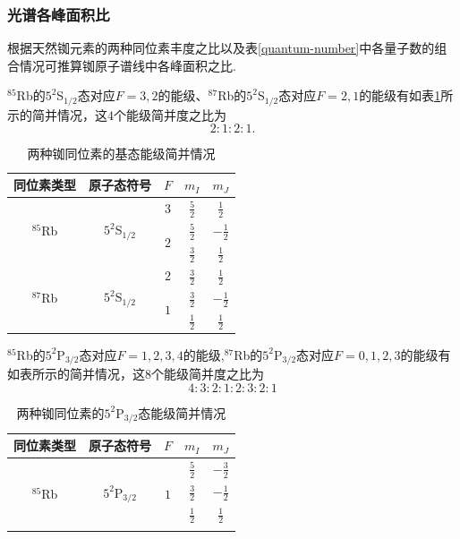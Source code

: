\documentclass[a4paper, 10pt]{article}
\begin{document}
\begin{multicols*}{2}
\subsubsection{光谱各峰面积比}
根据天然铷元素的两种同位素丰度之比以及表\ref{quantum-number}中各量子数的组合情况可推算铷原子谱线中各峰面积之比.

$^{85}$Rb的$5^2$S$_{1/2}$态对应$F=3,2$的能级、$^{87}$Rb的$5^2$S$_{1/2}$态对应$F=2,1$的能级有如表\ref{ground-state-degenerate}所示的简并情况，这$4$个能级简并度之比为
\[
    2:1:2:1.
\]
\begin{table}[H]
    \centering
    \scriptsize
    \caption{两种铷同位素的基态能级简并情况}
    \label{ground-state-degenerate}
    \begin{tabular}{|c|c|c|c|c|}
    \hline
    同位素类型 & 原子态符号 & $F$ & $m_I$ & $m_J$ \\ \hline
    \multirow{3}{*}{$^{85}$Rb} & \multirow{3}{*}{$5^2$S$_{1/2}$} & $3$ & $\frac{5}{2}$ & $\frac{1}{2}$ \\ \cline{3-5} 
     &  & \multirow{2}{*}{$2$} & $\frac{5}{2}$ & $-\frac{1}{2}$ \\ \cline{4-5} 
     &  &  & $\frac{3}{2}$ & $\frac{1}{2}$ \\ \hline
    \multirow{3}{*}{$^{87}$Rb} & \multirow{3}{*}{$5^2$S$_{1/2}$} & $2$ & $\frac{3}{2}$ & $\frac{1}{2}$ \\ \cline{3-5} 
     &  & \multirow{2}{*}{$1$} & $\frac{3}{2}$ & $-\frac{1}{2}$ \\ \cline{4-5} 
     &  &  & $\frac{1}{2}$ & $\frac{1}{2}$ \\ \hline
    \end{tabular}
    \end{table}
$^{85}$Rb的$5^2$P$_{3/2}$态对应$F=1,2,3,4$的能级,$^{87}$Rb的$5^2$P$_{3/2}$态对应$F=0,1,2,3$的能级有如表所示的简并情况，这$8$个能级简并度之比为
\[
    4:3:2:1:2:3:2:1
\]
\begin{table}[H]
    \centering
    \scriptsize
    \caption{两种铷同位素的$5^2$P$_{3/2}$态能级简并情况}
    \label{excited-state-degenerate}
    \begin{tabular}{|c|c|c|c|c|}
    \hline
    同位素类型 & 原子态符号 & $F$ & $m_I$ & $m_J$ \\ \hline
    \multirow{10}{*}{$^{85}$Rb} & \multirow{10}{*}{$5^2$P$_{3/2}$} & \multirow{4}{*}{$1$} & $\frac{5}{2}$ & $-\frac{3}{2}$ \\ \cline{4-5} 
        &  &  & $\frac{3}{2}$ & $-\frac{1}{2}$ \\ \cline{4-5} 
        &  &  & $\frac{1}{2}$ & $\frac{1}{2}$ \\ \cline{4-5} 

\end{tabular}
\end{table}
\end{multicols*}
\end{document}
